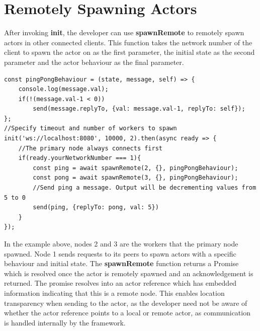 \documentclass[oneside]{um-fict}
\begin{document}
\section{Remotely Spawning Actors}
After invoking \textbf{init}, the developer can use \textbf{spawnRemote} to remotely spawn actors in other connected clients. This function takes the network number of the client to spawn the actor on as the first parameter, the initial state as the second parameter and the actor behaviour as the final parameter.
\newpage
\begin{lstlisting}
const pingPongBehaviour = (state, message, self) => {
    console.log(message.val);
    if(!(message.val-1 < 0))
        send(message.replyTo, {val: message.val-1, replyTo: self});
};
//Specify timeout and number of workers to spawn
init('ws://localhost:8080', 10000, 2).then(async ready => {
    //The primary node always connects first
    if(ready.yourNetworkNumber === 1){
        const ping = await spawnRemote(2, {}, pingPongBehaviour);
        const pong = await spawnRemote(3, {}, pingPongBehaviour);
        //Send ping a message. Output will be decrementing values from 5 to 0
        send(ping, {replyTo: pong, val: 5})
    }
});
\end{lstlisting}
In the example above, nodes 2 and 3 are the workers that the primary node spawned. Node 1 sends requests to its peers to spawn actors with a specific behaviour and initial state. The \textbf{spawnRemote} function returns a Promise which is resolved once the actor is remotely spawned and an acknowledgement is returned. The promise resolves into an actor reference which has embedded information indicating that this is a remote node. This enables location transparency when sending to the actor, as the developer need not be aware of whether the actor reference points to a local or remote actor, as communication is handled internally by the framework.
\end{document}

